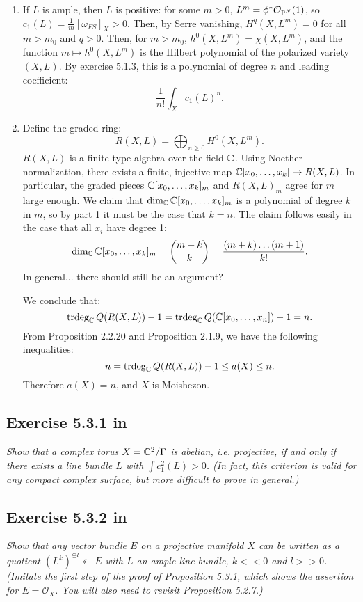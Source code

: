 \documentclass{article}
\begin{document}
\begin{enumerate}
\item If $L$ is ample, then $L$ is positive: for some $m>0$, $L^m = \phi^*\mathcal{O}_{\operatorname{\mathbb{P}}^N}(1)$, so
$c_1(L) = \frac{1}{m} [\omega_{FS}]_X > 0$. Then, by Serre vanishing, $H^q(X,L^m) = 0$ for all $m>m_0$ and
$q>0$. Then, for $m>m_0$, $h^0(X,L^m) = \chi(X,L^m)$, and the function $m \mapsto h^0(X,L^m)$ is the Hilbert
polynomial of the polarized variety $(X,L)$. By exercise 5.1.3, this is a polynomial of degree $n$ and leading
coefficient:
\[ \frac{1}{n!} \int_X c_1(L)^n. \]

\item Define the graded ring:
\[	R(X,L) = \bigoplus_{n\geq 0} H^0(X,L^m) .	\]
$R(X,L)$ is a finite type algebra over the field $\mathbb{C}$. 
Using Noether normalization, there exists a finite, injective map $\mathbb{C}[x_0, \dots, x_k] \to R(X,L)$. In particular,
the graded pieces $\mathbb{C}[x_0, \dots, x_k]_m$ and $R(X,L)_m$ agree for $m$ large enough. We claim that
$\dim_{\mathbb{C}} \mathbb{C}[x_0, \dots, x_k]_m$ is a polynomial of degree $k$ in $m$, so by part 1 it must be the case that $k=n$. The claim
follows easily in the case that all $x_i$ have degree 1:
\[	\dim_{\mathbb{C}} \mathbb{C}[x_0, \dots, x_k]_m = \binom{m+k}{k} = \frac{(m+k) \dots (m+1)}{k!} .	\]
In general... there should still be an argument? 

We conclude that:
\[	\operatorname{trdeg}_{\mathbb{C}}	Q(R(X,L)) - 1 = \operatorname{trdeg}_{\mathbb{C}} Q(\mathbb{C}[x_0, \dots, x_n]) - 1 = n. \]
From Proposition 2.2.20 and Proposition 2.1.9, we have the following inequalities:
\[	n = \operatorname{trdeg}_{\mathbb{C}}	Q(R(X,L)) - 1 \leq a(X) \leq n.	\]
Therefore $a(X) = n$, and $X$ is Moishezon.
\end{enumerate}



\subsection*{Exercise 5.3.1 in \cite{Huy}}
\emph{Show that a complex torus $X =\mathbb{C}^2/\Gamma$ is abelian, i.e. projective, if and only if
there exists a line bundle $L$ with $\int c_1^2(L) > 0$. (In fact, this criterion is valid for any
compact complex surface, but more difficult to prove in general.)}
\vspace{3mm}


\subsection*{Exercise 5.3.2 in \cite{Huy}}
\emph{Show that any vector bundle $E$ on a projective manifold $X$ can be written
as a quotient $(L^k)^{\oplus l} \twoheadleftarrow E$ with $L$ an ample line bundle, $k << 0$ and $l>> 0$. (Imitate
the first step of the proof of Proposition 5.3.1, which shows the assertion for $E = \mathcal{O}_X$.
You will also need to revisit Proposition 5.2.7.)}
\vspace{3mm}
\end{document}
